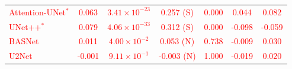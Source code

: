 \documentclass[12pt,letterpaper]{article}
\begin{document}
\begin{enumerate}
\begin{table}[H]
{\begin{tabular}{lcccccc}
\textcolor{red}{Attention-UNet$^{*}$} 
& \textcolor{red}{0.063} 
& \textcolor{red}{$3.41 \times 10^{-23}$} 
& \textcolor{red}{0.257 (S)} 
& \textcolor{red}{0.000} 
& \textcolor{red}{0.044} 
& \textcolor{red}{0.082} \\

\textcolor{red}{UNet++$^{*}$} 
& \textcolor{red}{0.079} 
& \textcolor{red}{$4.06 \times 10^{-33}$} 
& \textcolor{red}{0.312 (S)} 
& \textcolor{red}{0.000} 
& \textcolor{red}{-0.098} 
& \textcolor{red}{-0.059} \\

\textcolor{red}{BASNet} 
& \textcolor{red}{0.011} 
& \textcolor{red}{$4.00 \times 10^{-2}$} 
& \textcolor{red}{0.053 (N)} 
& \textcolor{red}{0.738} 
& \textcolor{red}{-0.009} 
& \textcolor{red}{0.030} \\

\textcolor{red}{U2Net} 
& \textcolor{red}{-0.001} 
& \textcolor{red}{$9.11 \times 10^{-1}$} 
& \textcolor{red}{-0.003 (N)} 
& \textcolor{red}{1.000} 
& \textcolor{red}{-0.019} 
& \textcolor{red}{0.020} \\

\hline
\end{tabular}}
\label{tab:stats_analysis_on_old_data_dsc}
\end{table}
 





\end{enumerate}
\end{document}
